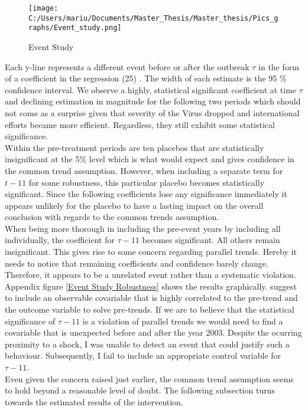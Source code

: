 \documentclass{article}
\begin{document}
\begin{figure}[!ht]
\begin{center}\caption{Event Study \label{Event Study}}
\texttt{[image: C:/Users/mariu/Documents/Master\_Thesis/Master\_thesis/Pics\_graphs/Event\_study.png]}\\
\end{center}
\end{figure}

Each y-line represents a different event before or after the outbreak $\tau$ in the form of a coefficient in the regression (25) . The width of each estimate is the 95 \% confidence interval. We observe a highly, statistical significant coefficient at time $\tau$ and declining  estimation in magnitude for the following two periods which should not come as a surprise given that severity of the Virus dropped and international efforts became more efficient. Regardless, they still exhibit some statistical significance.\\
Within the pre-treatment periods are ten placebos that are statistically insignificant at the 5\% level which is what would expect and gives confidence in the common trend assumption. However, when including a separate term for $t-11$ for some robustness, this particular placebo becomes statistically significant. Since the following coefficients lose any significance immediately it appears unlikely for the placebo to have a lasting impact on the overall conclusion with regards to the common trends assumption. \\
When being more thorough in including the pre-event years by including all individually, the coefficient for $\tau - 11$ becomes significant. All others remain insignificant. This gives rise to some concern regarding parallel trends. Hereby it needs to notice that remaining coefficients and confidence barely change. Therefore, it appears to be a unrelated event rather than a systematic violation. Appendix figure \ref{Event Study Robustness} shows the results graphically. \cite{freyal2018pre} suggest to include an observable covariable that is highly correlated to the pre-trend and the outcome variable to solve pre-trends. If we are to believe that the statistical significance of $\tau - 11$ is a violation of parallel trends we would need to find a covariable that is unexpected before and after the year 2003. Despite the ocurring proximity to a shock, I was unable to detect an event that could justify such a behaviour. Subsequently, I fail to include an appropriate control variable for $\tau - 11$.\\
Even given the concern raised just earlier, the common trend assumption seems to hold beyond a reasonable level of doubt. The following subsection turns towards the estimated results of the intervention.
\end{document}
